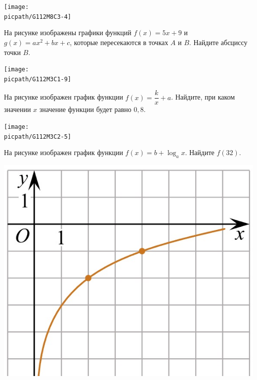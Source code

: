 \begin{class}[number=3]
\begin{listofex}
		\hspace{0.02\linewidth}
		\begin{minipage}[t]{\picwidth}
			\texttt{[image: \\picpath/G112M8C3-4]}
		\end{minipage}
		\item
		\begin{minipage}[t]{\bodywidth}
			На рисунке изображены графики функций \(f(x)=5x+9\) и \( g(x)=ax^2+bx+c \), которые пересекаются в точках \(A\) и \(B\). Найдите абсциссу точки \(B\).
		\end{minipage}
		\hspace{0.02\linewidth}
		\begin{minipage}[t]{\picwidth}
			\texttt{[image: \\picpath/G112M3C1-9]}
		\end{minipage}
		
		\item
		\begin{minipage}[t]{\bodywidth}
			На рисунке изображен график функции \( f(x)=\dfrac{k}{x}+a \). Найдите, при каком значении \( x \) значение функции будет равно \( 0,8 \).
		\end{minipage}
		\hspace{0.02\linewidth}
		\begin{minipage}[t]{\picwidth}
			\texttt{[image: \\picpath/G112M3C2-5]}
		\end{minipage}
		\item %
		\begin{minipage}[t]{\bodywidth}
			На рисунке изображен график функции \(f(x) = b+\log_ax \). Найдите \(f(32)\).
		\end{minipage}
		\hspace{0.02\linewidth}
		\begin{minipage}[t]{\picwidth}
			\includegraphics[align=t, width=\linewidth]{../pics/G111M8L1-1}
		\end{minipage}
	\end{listofex}
\end{class}

